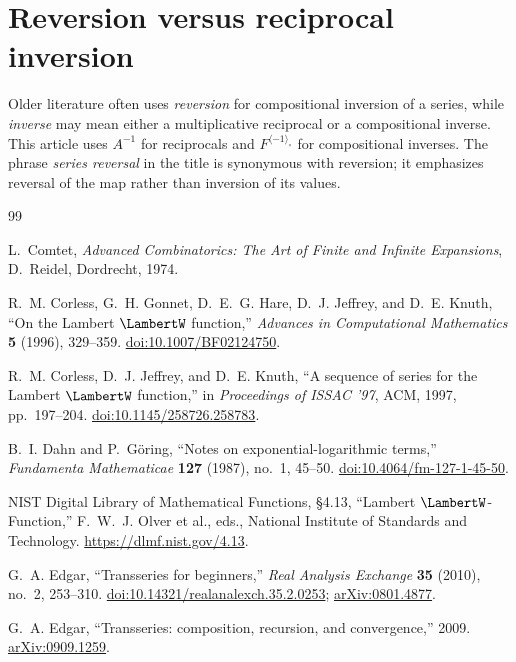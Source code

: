 \documentclass[11pt,oneside,openany]{book}
\newcommand{\rev}{^{\langle-1\rangle_{\circ}}}
\begin{document}
\section{Reversion versus reciprocal inversion}
Older literature often uses \emph{reversion} for compositional inversion of a
series, while \emph{inverse} may mean either a multiplicative reciprocal or a
compositional inverse.  This article uses \(A^{-1}\) for reciprocals and
\(F\rev\) for compositional inverses.  The phrase \emph{series reversal}
in the title is synonymous with reversion; it emphasizes reversal of the map
rather than inversion of its values.

\backmatter

\begin{thebibliography}{99}

L.~Comtet,
\emph{Advanced Combinatorics: The Art of Finite and Infinite Expansions},
D.~Reidel, Dordrecht, 1974.

R.~M. Corless, G.~H. Gonnet, D.~E.~G. Hare, D.~J. Jeffrey, and D.~E. Knuth,
``On the Lambert \(\LambertW\) function,''
\emph{Advances in Computational Mathematics} \textbf{5} (1996), 329--359.
\href{https://doi.org/10.1007/BF02124750}{doi:10.1007/BF02124750}.

R.~M. Corless, D.~J. Jeffrey, and D.~E. Knuth,
``A sequence of series for the Lambert \(\LambertW\) function,''
in \emph{Proceedings of ISSAC '97}, ACM, 1997, pp.~197--204.
\href{https://doi.org/10.1145/258726.258783}{doi:10.1145/258726.258783}.

B.~I. Dahn and P.~G\"oring,
``Notes on exponential-logarithmic terms,''
\emph{Fundamenta Mathematicae} \textbf{127} (1987), no.~1, 45--50.
\href{https://doi.org/10.4064/fm-127-1-45-50}{doi:10.4064/fm-127-1-45-50}.

NIST Digital Library of Mathematical Functions,
\S4.13, ``Lambert \(\LambertW\)-Function,''
F.~W.~J. Olver et al., eds., National Institute of Standards and Technology.
\url{https://dlmf.nist.gov/4.13}.

G.~A. Edgar,
``Transseries for beginners,''
\emph{Real Analysis Exchange} \textbf{35} (2010), no.~2, 253--310.
\href{https://doi.org/10.14321/realanalexch.35.2.0253}{doi:10.14321/realanalexch.35.2.0253};
\href{https://arxiv.org/abs/0801.4877}{arXiv:0801.4877}.

G.~A. Edgar,
``Transseries: composition, recursion, and convergence,'' 2009.
\href{https://arxiv.org/abs/0909.1259}{arXiv:0909.1259}.


\end{thebibliography}
\end{document}
